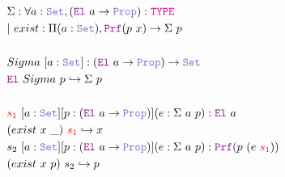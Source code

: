 \begin{figure}
\begin{framed}
\begin{align*}
&\Sigma : \forall a : \set{}, (\el{}~a \ra \prop): \type \\
&|~exist : \Pi (a : \set{}), \prf (p~x) \ra \Sigma~p \\
&\\
& Sigma~[a: \set{}]: (\el{}~a \ra \prop) \ra \set{} \\
& \el{}~Sigma~p \re \Sigma~p \\
&\\
& \textcolor{red}{s_1}~[a: \set{}] [p:(\el{}~a \ra \prop)] (e: \Sigma~a~p): \el{}~a \\
& (exist~x~\_)~\textcolor{red}{s_1} \re x\\
& s_2~[a: \set{}] [p:(\el{}~a \ra \prop)] (e: \Sigma~a~p): \prf{}(p~(e~\textcolor{red}{s_1})) \\
& (exist~x~p)~s_2 \re p\\
\end{align*}



\end{framed}
\end{figure}
